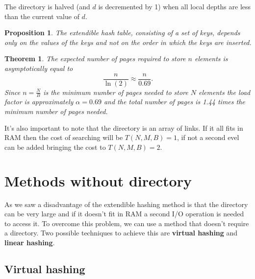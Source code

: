 \documentclass{report}
\newtheorem{prop}{Proposition}[chapter]
\newtheorem{teo}{Theorem}[chapter]
\begin{document}
The directory is halved (and $d$ is decremented by 1) when all local depths are less than the current value of $d$.
\begin{prop}
    The extendible hash table, consisting of a set of keys, depends only on the values of the keys and not on the order in which the keys are inserted.
\end{prop}
\begin{teo}
    The expected number of pages required to store $n$ elements is asymptotically equal to
    \begin{equation}
    \frac{n}{\ln(2)} \approx \frac{n}{0.69}.
    \end{equation}
    Since \(n = \frac{N}{B}\) is the minimum number of pages needed to store \(N\) elements the load factor is approximately \(\alpha = 0.69\) and the total number of pages is 1.44 times the minimum number of pages needed.
\end{teo}
It's also important to note that the directory is an array of links. If it all fits in RAM then the cost of searching will be \(T(N,M,B) = 1\), if not a second evel can be added bringing the cost to \(T(N,M,B) = 2\).
\section*{Methods without directory}
As we saw a disadvantage of the extendible hashing method is that the directory can be very large and if it doesn't fit in RAM a second I/O operation is needed to access it. To overcome this problem, we can use a method that doesn't require a directory. Two possible techniques to achieve this are \textbf{virtual hashing} and \textbf{linear hashing}.
\subsection{Virtual hashing}
\end{document}
